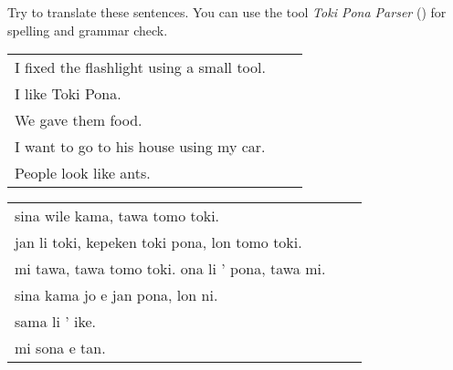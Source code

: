 Try to translate these sentences.
You can use the tool \textit{Toki Pona Parser} (\cite{www:rowa:02}) for spelling and grammar check.

\begin{supertabular}{p{5,5cm}|ll}
    I fixed the flashlight using a small tool. &  & \\  %
    I like Toki Pona.                          &  & \\  %
    We gave them food.                         &  & \\ %
    I want to go to his house using my car.    &  & \\  %
    People look like ants.                     &  & \\ %
\end{supertabular}

\begin{supertabular}{p{5,5cm}|ll}
    sina wile kama, tawa tomo toki.                  &  & \\ %
    jan li toki, kepeken toki pona, lon tomo toki.   &  & \\ %
    mi tawa, tawa tomo toki. ona li ' pona, tawa mi. &  & \\ %
    sina kama jo e jan pona, lon ni.                 &  & \\ %
    sama li ' ike.                                   &  & \\ %
    mi sona e tan.                                   &  & \\ %
\end{supertabular}

%
